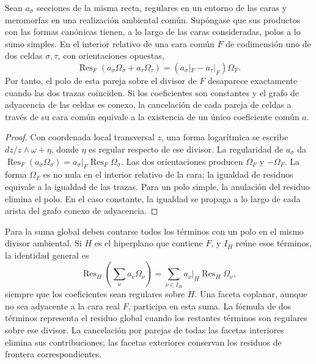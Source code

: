 \begin{theorem}
\label{thm:compat-pegado}
Sean \(a_\sigma\) secciones de la misma recta, regulares en un
entorno de las caras y meromorfas en una realización ambiental común.
Supóngase que sus productos con las formas canónicas tienen, a lo
largo de las caras consideradas, polos a lo sumo simples. En el
interior relativo de una cara común \(F\) de codimensión uno de dos celdas
\(\sigma,\tau\), con orientaciones opuestas,
\begin{equation}
 \operatorname{Res}_F\left(a_\sigma\Omega_\sigma+a_\tau\Omega_\tau\right)
 =\left(a_\sigma|_F-a_\tau|_F\right)\Omega_F.
 \label{eq:compat-defecto-frontera}
\end{equation}
Por tanto, el polo de esta pareja sobre el divisor de \(F\) desaparece
exactamente cuando las dos trazas coinciden. Si los coeficientes son
constantes y el grafo de adyacencia de las celdas es conexo, la cancelación
de cada pareja de celdas a través de su cara común equivale a la existencia
de un único coeficiente común \(a\).
\end{theorem}
\begin{proof}
Con coordenada local transversal \(z\), una forma logarítmica se
escribe \(dz/z\wedge\omega+\eta\), donde \(\eta\) es regular
respecto de ese divisor. La regularidad de \(a_\sigma\) da
\(\operatorname{Res}_F(a_\sigma\Omega_\sigma)
=a_\sigma|_F\operatorname{Res}_F\Omega_\sigma\).
Las dos orientaciones producen \(\Omega_F\) y \(-\Omega_F\).
La forma \(\Omega_F\) es no nula en el interior relativo de la
cara; la igualdad de residuos equivale a la igualdad de las trazas.
Para un polo simple, la anulación del residuo elimina el polo.
En el caso constante, la igualdad se propaga a lo largo de cada
arista del grafo conexo de adyacencia.
\end{proof}

Para la suma global deben contarse todos los términos con un polo en el
mismo divisor ambiental. Si \(H\) es el hiperplano que contiene \(F\),
y \(I_H\) reúne esos términos, la identidad general es
\[
 \operatorname{Res}_{H}\left(\sum_\nu a_\nu\Omega_\nu\right)
 =\sum_{\nu\in I_H}a_\nu|_H\operatorname{Res}_H\Omega_\nu,
\]
siempre que los coeficientes sean regulares sobre \(H\). Una faceta
coplanar, aunque no sea adyacente a la cara real \(F\), participa en esta
suma. La fórmula de dos términos representa el residuo global cuando
los restantes términos son regulares sobre ese divisor. La cancelación
por parejas de todas las facetas interiores elimina sus contribuciones;
las facetas exteriores conservan los residuos de frontera correspondientes.


